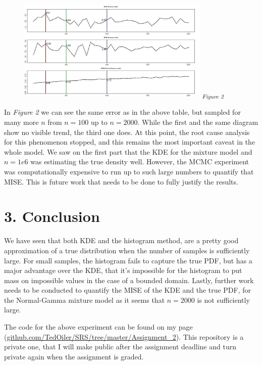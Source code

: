 \documentclass[fleqn, a4paper]{report}
\begin{document}
\begin{figure}[!h]
\includegraphics[width=0.82\textwidth]{./images/MISE error.jpg}
\textsubscript{\textit{Figure 2}}
\label{tab:fig_2}
\end{figure}

In \textit{Figure 2} we can see the same error as in the above table, but sampled for many more $n$ from $n=100$ up to $n=2000$. While the first and the same diagram show no visible trend, the third one does. At this point, the root cause analysis for this phenomenon stopped, and this remains the most important caveat in the whole model. We saw on the first part that the KDE for the mixture model and $n=1e6$ was estimating the true density well. However, the MCMC experiment was computationally expensive to run up to such large numbers to quantify that MISE. This is future work that needs to be done to fully justify the results. 

\section*{3. Conclusion}
We have seen that both KDE and the histogram method, are a pretty good approximation of a true distribution when the number of samples is sufficiently large. For small samples, the histogram fails to capture the true PDF, but has a major advantage over the KDE, that it's impossible for the histogram to put mass on impossible values in the case of a bounded domain. Lastly, further work needs to be conducted to quantify the MISE of the KDE and the true PDF, for the Normal-Gamma mixture model as it seems that $n=2000$ is not sufficiently large.

The code for the above experiment can be found on my \href{https://github.com/TedOiler/SRS/tree/master/Assignment_2}{\faGithub} page (\url{github.com/TedOiler/SRS/tree/master/Assignment_2}). This repository is a private one, that I will make public after the assignment deadline and turn private again when the assignment is graded.



\end{document}
